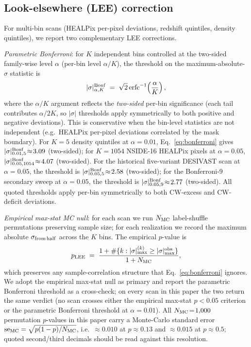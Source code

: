 \documentclass[aps,prd,twocolumn,superscriptaddress,showpacs,preprintnumbers,nofootinbib,longbibliography,floatfix]{revtex4-2}
\begin{document}
\subsection{Look-elsewhere (LEE) correction}\label{sec:lee}

For multi-bin scans (HEALPix per-pixel deviations, redshift quintiles,
density quintiles), we report two complementary LEE corrections.

\emph{Parametric Bonferroni}: for $K$ independent bins controlled at
the two-sided family-wise level $\alpha$ (per-bin level $\alpha/K$),
the threshold on the maximum-absolute-$\sigma$ statistic is
\begin{equation}\label{eq:bonferroni}
|\sigma|^{\rm Bonf}_{\alpha,K} \;=\; \sqrt{2}\,
\mathrm{erfc}^{-1}\!\left(\frac{\alpha}{K}\right),
\end{equation}
where the $\alpha/K$ argument reflects the \emph{two-sided} per-bin
significance (each tail contributes $\alpha/2K$, so $|\sigma|$
thresholds apply symmetrically to both positive and negative
deviations). This is conservative when the bin-level statistics are not
independent (e.g.\ HEALPix per-pixel deviations correlated by the
mask boundary). For $K\!=\!5$ density quintiles at $\alpha\!=\!0.01$,
Eq.~\eqref{eq:bonferroni} gives $|\sigma|^{\rm Bonf}_{0.01,5}\!\approx\!3.09$
(two-sided); for $K\!=\!1054$ NSIDE-16 HEALPix pixels at $\alpha\!=\!0.05$,
$|\sigma|^{\rm Bonf}_{0.05,1054}\!\approx\!4.07$ (two-sided). For the
historical five-variant DESIVAST scan at $\alpha\!=\!0.05$, the threshold is
$|\sigma|^{\rm Bonf}_{0.05,5}\!\approx\!2.58$ (two-sided); for the Bonferroni-9
secondary sweep at $\alpha\!=\!0.05$, the threshold is
$|\sigma|^{\rm Bonf}_{0.05,9}\!\approx\!2.77$ (two-sided). All quoted
thresholds apply per-bin symmetrically to both CW-excess and CW-deficit
deviations.

\emph{Empirical max-stat MC null}: for each scan we run $N_{\rm MC}$
label-shuffle permutations preserving sample size; for each
realization we record the maximum absolute $\sigma_{\rm from\,half}$
across the $K$ bins. The empirical $p$-value is
\begin{equation}\label{eq:empirical_p}
p_{\rm LEE} \;=\; \frac{1 + \#\{k : |\sigma|_{\max}^{(k)} \ge |\sigma|_{\max}^{\rm obs}\}}{1 + N_{\rm MC}},
\end{equation}
which preserves any sample-correlation structure that
Eq.~\eqref{eq:bonferroni} ignores. We adopt the empirical max-stat
null as primary and report the parametric Bonferroni threshold as a
cross-check; on every scan in this paper the two return the same
verdict (no scan crosses either the empirical max-stat $p < 0.05$
criterion or the parametric Bonferroni threshold at
$\alpha\!=\!0.01$). All $N_{\rm MC}\!=\!1{,}000$ permutation
$p$-values in this paper carry a Monte-Carlo standard error
${\rm se}_{\rm MC} = \sqrt{p(1-p)/N_{\rm MC}}$, i.e.\
${\approx}0.010$ at $p \approx 0.13$ and ${\approx}0.015$ at
$p \approx 0.5$; quoted second/third decimals should be read against
this resolution.
\end{document}
